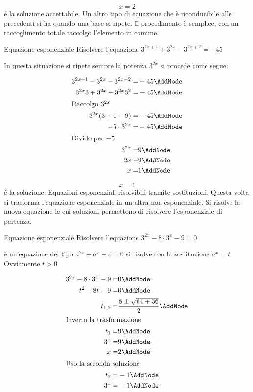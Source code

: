 	\[x=2\]
	\'{e} la soluzione accettabile.
Un altro tipo di equazione che è riconducibile alle precedenti si ha quando una base si ripete. Il procedimento è semplice, con un raccoglimento totale raccolgo l'elemento in comune. 
\begin{esempiot}{Equazione esponenziale}{}
	Risolvere l'equazione $3^{2x+1}+3^{2x}-3^{2x+2}=-45$
\end{esempiot}
	In questa situazione si ripete sempre la potenza $3^{2x}$  si procede come segue:\newpage
	\begin{NodesList}%
		\begin{align*}
			3^{2x+1}+3^{2x}-3^{2x+2}=&-45\AddNode\\
			3^{2x}3+3^{2x}-3^{2x}3^2=&-45\AddNode\\
			\intertext{\hfil Raccolgo $3^{2x}$}
			3^{2x}(3+1-9)=&-45\AddNode\\
			-5\cdot 3^{2x}=&-45\AddNode\\
			\intertext{\hfil Divido per $-5$}
			3^{2x}=&9\AddNode\\
			2x=&2\AddNode\\
			x=&1\AddNode\\
		\end{align*}
	\end{NodesList}
	\[x=1\]
	\'{e} la soluzione.
Equazioni esponenziali risolvibili tramite sostituzioni. Questa volta si trasforma l'equazione esponenziale in un altra non esponenziale. Si risolve la nuova equazione le cui soluzioni permettono di risolvere l'esponenziale di partenza.
\begin{esempiot}{Equazione esponenziale}{}
	Risolvere l'equazione $3^{2x}-8\cdot 3^x-9=0$
\end{esempiot}
	 è un'equazione del tipo $a^{2x}+a^{x}+c=0$ si risolve con la sostituzione $a^{x}=t$ Ovviamente $t>0$ 
	\begin{NodesList} %
		\begin{align*}
			3^{2x}-8\cdot 3^x-9=&0\AddNode\\
			t^2-8t-9=&0\AddNode\\
			t_{1,2}=&\dfrac{8\pm\sqrt{64+36}}{2}\AddNode\\
			\intertext{\hfil Inverto la trasformazione}
			t_{1}=&9\AddNode\\
			3^{x}=&9\AddNode\\
			x=&2\AddNode\\
			\intertext{\hfil Uso la seconda soluzione}
			t_{2}=&-1\AddNode\\
			3^x=&-1\AddNode
		\end{align*}
		\LinkNodes{}%
	\end{NodesList}
